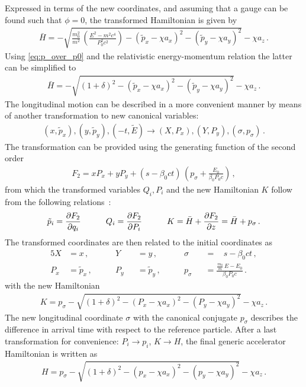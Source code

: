 Expressed in terms of the new coordinates, and assuming that a gauge can be found such that $\phi=0$, the transformed Hamiltonian is given by
%
\begin{align}
\bar{H} = - \sqrt{ \frac{m_0^2}{m^2} \, \left( \frac{E^2 - m^2 c^4}{P_0^2c^2} \right)   - (\tilde{p}_x - \chi a_x)^2 - (\tilde{p}_y- \chi a_y)^2   } - \chi a_z \, .
\end{align}
% 
Using \eqref{eq:p_over_p0} and the relativistic energy-momentum relation the latter can be simplified to
\begin{align}
\bar{H} = - \sqrt{(1+\delta)^2  - (\tilde{p}_x - \chi a_x)^2 - (\tilde{p}_y-\chi a_y)^2 } - \chi a_z \, .
\end{align}
%
The longitudinal motion can be described in a more convenient manner by means of another transformation to new canonical variables:
%
\begin{align}
(x,\tilde{p}_x), (y,\tilde{p}_y), (-t,\tilde{E}) \rightarrow (X,P_x), (Y,P_y), (\sigma,p_\sigma) \, .
\end{align}
%
The transformation can be provided using the generating function of the second order
\begin{align}
F_2 = x P_x + y P_y + (s-\beta_0 ct) \, \left( p_\sigma + \frac{E_0}{\beta_0 P_0 c} \right) \, ,
\end{align}
%
from which the transformed variables ${Q_i,P_i}$ and the new Hamiltonian $K$ follow from the following relations~\cite{ProceedingsCAS1995}:
%
%
\begin{align}
\tilde{p}_i = \frac{\partial F_2}{\partial q_i} \quad \quad \quad Q_i = \frac{\partial F_2}{\partial P_i} \quad \quad \quad K = \bar{H} + \frac{\partial F_2}{\partial z} = \bar{H}+p_\sigma \, .
\end{align}
%
The transformed coordinates are then related to the initial coordinates as
%
\begin{alignat}{5}
X  &= x  \, ,          \quad \quad  &Y   &&= y  \, ,           \quad \quad &\sigma   &&= \phantom{m} s - \beta_0 ct \, ,  \\ \label{eq:sigmadefinition}
P_x&= \tilde{p}_x  \, , \quad \quad  &P_y &&= \tilde{p}_y \, ,  \quad \quad &p_\sigma &&= \frac{\frac{m_0}{m} \, E - E_0}{\beta_0 P_0 c} \, .
\end{alignat}
%
with the new Hamiltonian 
%
\begin{align}
K = p_\sigma - \sqrt{(1+\delta)^2 - (P_x - \chi a_x)^2 - (P_y-\chi a_y)^2} - \chi a_z \, .
\end{align}
%
The new longitudinal coordinate $\sigma$ with the canonical conjugate $p_\sigma$ describes the difference in arrival time with respect to the reference particle. 
%
After a last transformation for convenience: $P_i \rightarrow p_i$, $K \rightarrow H$, the final generic accelerator Hamiltonian is written as
\begin{align}
H = p_\sigma - \sqrt{(1+\delta)^2 - (p_x - \chi a_x)^2 - (p_y-\chi a_y)^2} - \chi a_z \, .
\end{align}


